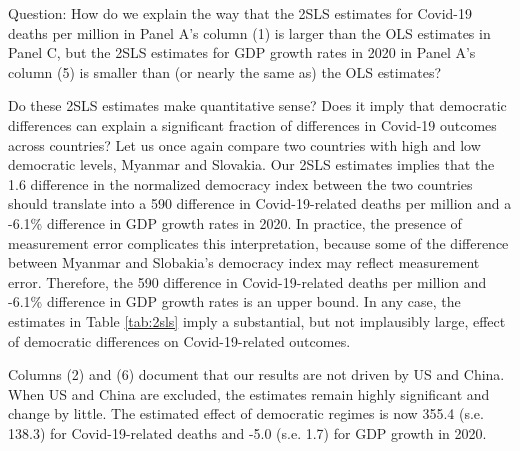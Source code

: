 {\color{red} Question: How do we explain the way that the 2SLS estimates for Covid-19 deaths per million in Panel A’s column (1) is larger than the OLS estimates in Panel C, but the 2SLS estimates for GDP growth rates in 2020 in Panel A’s column (5) is smaller than (or nearly the same as) the OLS estimates? }


Do these 2SLS estimates make quantitative sense? Does it imply that democratic differences can explain a significant fraction of differences in Covid-19 outcomes across countries? Let us once again compare two countries with high and low democratic levels, Myanmar and Slovakia. Our 2SLS estimates implies that the 1.6 difference in the normalized democracy index between the two countries should translate into a 590 difference in Covid-19-related deaths per million and a -6.1\% difference in GDP growth rates in 2020. In practice, the presence of measurement error complicates this interpretation, because some of the difference between Myanmar and Slobakia's democracy index may reflect measurement error. Therefore, the 590 difference in Covid-19-related deaths per million and -6.1\% difference in GDP growth rates is an upper bound. In any case, the estimates in Table \ref{tab:2sls} imply a substantial, but not implausibly large, effect of democratic differences on Covid-19-related outcomes. 

Columns (2) and (6) document that our results are not driven by US and China. When US and China are excluded, the estimates remain highly significant and change by little. The estimated effect of democratic regimes is now 355.4 (s.e. 138.3) for Covid-19-related deaths and -5.0 (s.e. 1.7) for GDP growth in 2020. 

